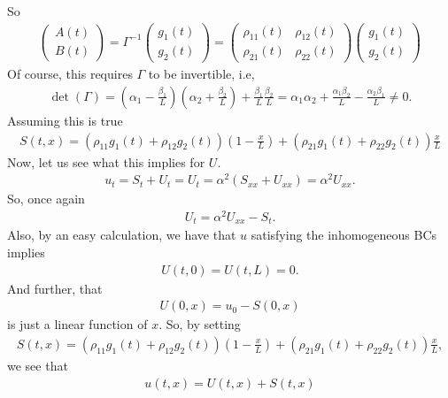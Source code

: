 \documentclass{article}
\theoremstyle{definition}
\begin{document}
So
\begin{align*}
\begin{pmatrix}
A(t)\\B(t)
\end{pmatrix} = \Gamma^{-1}\begin{pmatrix}
g_1(t)\\g_2(t)
\end{pmatrix}=
\begin{pmatrix}
\rho_{11}(t)&\rho_{12}(t)\\
\rho_{21}(t) & \rho_{22}(t)
\end{pmatrix}
\begin{pmatrix}
g_1(t)\\g_2(t)
\end{pmatrix}
\end{align*}
Of course, this requires $\Gamma$ to be invertible, i.e, 
\begin{align*}
\det(\Gamma) = \left(\alpha_1 - \frac{\beta_1}{L}\right)\left(\alpha_2  + \frac{\beta_2}{L}\right) +  \frac{\beta_1}{L}\frac{\beta_2}{L} = \alpha_1 \alpha_2 + \frac{\alpha_1\beta_2}{L} - \frac{\alpha_2\beta_1}{L}\neq 0.
\end{align*}
Assuming this is true
\begin{align*}
S(t,x) = (\rho_{11}g_1(t) + \rho_{12}g_2(t))\left(1 - \frac{x}{L} \right) + (\rho_{21}g_1(t) + \rho_{22}g_2(t))\frac{x}{L}
\end{align*}
Now, let us see what this implies for $U$. 
\begin{align*}
u_t = S_t + U_t = U_t = \alpha^2(S_{xx} +  U_{xx}) = \alpha^2 U_{xx}.
\end{align*}
So, once again
\begin{align*}
U_t = \alpha^2 U_{xx} - S_t.
\end{align*}
Also, by an easy calculation, we have that $u$ satisfying the inhomogeneous BCs implies
\begin{align*}
U(t,0) = U(t,L) = 0.
\end{align*}
And further, that
\begin{align*}
U(0,x)= u_0 - S(0,x)
\end{align*}
is just a linear function of $x$. So, by setting 
\begin{align*}
S(t,x)= (\rho_{11}g_1(t) + \rho_{12}g_2(t))\left(1 - \frac{x}{L} \right) + (\rho_{21}g_1(t) + \rho_{22}g_2(t))\frac{x}{L},
\end{align*}
we see that
\begin{align*}
u(t,x) = U(t,x) + S(t,x)
\end{align*}
\end{document}
